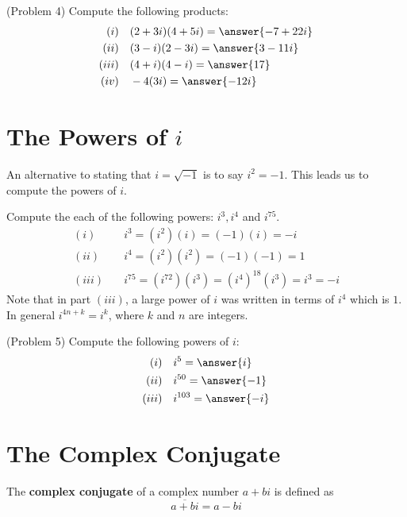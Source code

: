 \documentclass[handout]{ximera}
\begin{document}
\begin{problem}(Problem 4)
Compute the following products:
\begin{align*}
(i)& \quad (2+3i)  (4+5i) = \answer{-7+22i}\\
(ii)& \quad (3-i)  (2-3i) = \answer{3-11i}\\
(iii)& \quad (4+i)  (4-i) = \answer{17}\\
(iv)& \quad -4(3i)= \answer{-12i}
\end{align*}
\end{problem}


\section{The Powers of $i$}
An alternative to stating that $i = \sqrt {-1}$ is to say $i^2 = -1$. This leads us to compute the powers of $i$.

\begin{example}[Example 5]
Compute the each of the following powers: $i^3, i^4$ and $i^{75}$.
\begin{align*}
(i)& \quad i^3 = (i^2)(i) = (-1)(i) =-i\\
(ii)& \quad i^4 = (i^2)(i^2) = (-1)(-1) = 1\\
(iii)& \quad i^{75} = (i^{72})(i^3) = (i^4)^{18} (i^3) = i^3 = -i
\end{align*}
Note that in part $(iii)$, a large power of $i$ was written in terms of $i^4$ which is $1$.
In general $i^{4n+k} = i^k$, where $k$ and $n$ are integers.
\end{example}


\begin{problem}(Problem 5)
Compute the following powers of $i$:
\begin{align*}
(i)& \quad i^5 = \answer{i}\\
(ii)& \quad i^{50} = \answer{-1}\\
(iii)& \quad i^{103}= \answer{-i}
\end{align*}
\end{problem}



\section{The Complex Conjugate}

\begin{definition}
The {\bf complex conjugate} of a complex number $a+bi$ is defined as
\[
\overline {a+bi} = a-bi
\]
\end{definition}
\end{document}
